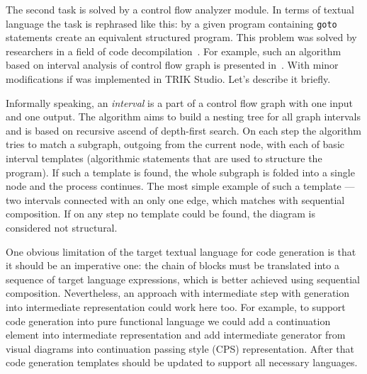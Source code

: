 \documentclass[conference]{IEEEtran}
\begin{document}
{The second task is solved by a control flow analyzer module. In terms of textual language the task is rephrased like this: by a given program containing \texttt{goto} statements create an equivalent structured program. This problem was solved by researchers in a field of code decompilation~\cite{steven1997advanced,деревенец2009структурный}. For example, such an algorithm based on interval analysis of control flow graph is presented in~\cite{steven1997advanced}. With minor modifications if was implemented in TRIK Studio. Let's describe it briefly.

Informally speaking, an \textit{interval} is a part of a control flow graph with one input and one output. The algorithm aims to build a nesting tree for all graph intervals and is based on recursive ascend of depth-first search. On each step the algorithm tries to match a subgraph, outgoing from the current node, with each of basic interval templates (algorithmic statements that are used to structure the program). If such a template is found, the whole subgraph is folded into a single node and the process continues. The most simple example of such a template --- two intervals connected with an only one edge, which matches with sequential composition. If on any step no template could be found, the diagram is considered not structural. 

One obvious limitation of the target textual language for code generation is that it should be an imperative one: the chain of blocks must be translated into a sequence of target language expressions, which is better achieved using sequential composition. Nevertheless, an approach with intermediate step with generation into intermediate representation could work here too. For example, to support code generation into pure functional language we could add a continuation element into intermediate representation and add intermediate generator from visual diagrams into continuation passing style (CPS) representation. After that code generation templates should be updated to support all necessary languages.
 
}
\end{document}
